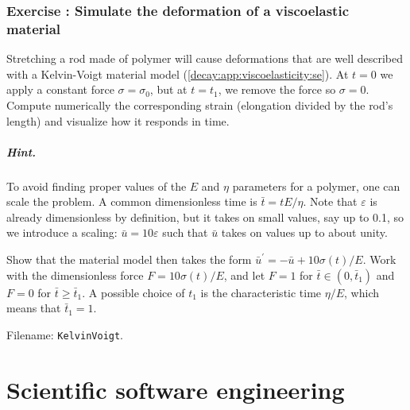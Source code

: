 \documentclass[graybox,sectrefs,envcountresetchap,open=right,final]{svmonodo}
\newenvironment{doconceexercise}{}{}
\newcounter{doconceexercisecounter}
\begin{document}
\begin{doconceexercise}

\subsection*{Exercise \thedoconceexercisecounter: Simulate the deformation of a viscoelastic material}

\label{decay:app:exer:viscoelasticity1}

Stretching a rod made of polymer will cause deformations that are
well described with a Kelvin-Voigt material model
(\ref{decay:app:viscoelasticity:se}). At $t=0$ we apply a constant
force $\sigma = \sigma_0$, but at $t=t_1$, we remove the force
so $\sigma=0$. Compute numerically the corresponding strain
(elongation divided by the rod's length) and visualize how it
responds in time.


\paragraph{Hint.}
To avoid finding proper values of the $E$ and $\eta$ parameters for
a polymer, one can scale the problem. A common dimensionless
time is $\bar t= tE/\eta$. Note that $\varepsilon$ is already
dimensionless by definition, but it takes on small values, say up to 0.1,
so we introduce a scaling: $\bar u=10\varepsilon$ such that $\bar u$
takes on values up to about unity.

Show that the material model then
takes the form $\bar u^{\prime} = -\bar u + 10\sigma(t)/E$.
Work with the dimensionless force $F=10\sigma(t)/E$, and let
$F=1$ for $\bar t\in (0,\bar t_1)$ and $F=0$ for $\bar t\geq \bar t_1$.
A possible choice of $t_1$ is the characteristic time $\eta/E$, which
means that $\bar t_1 = 1$.



\noindent Filename: \texttt{KelvinVoigt}.

\end{doconceexercise}


\chapter{Scientific software engineering}
\label{decay:se}
\end{document}
